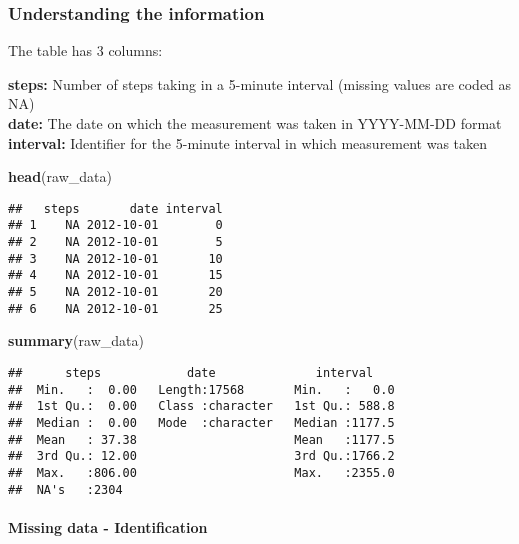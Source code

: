 \documentclass[
]{article}
\newenvironment{Shaded}{\begin{snugshade}}{\end{snugshade}}
\newcommand{\FunctionTok}[1]{\textcolor[rgb]{0.13,0.29,0.53}{\textbf{#1}}}
\newcommand{\NormalTok}[1]{#1}
\begin{document}
\hypertarget{understanding-the-information}{%
\subsubsection{Understanding the
information}\label{understanding-the-information}}

The table has 3 columns:

\textbf{steps:} Number of steps taking in a 5-minute interval (missing
values are coded as NA)\\
\textbf{date:} The date on which the measurement was taken in YYYY-MM-DD
format\\
\textbf{interval:} Identifier for the 5-minute interval in which
measurement was taken

\begin{Shaded}
\begin{Highlighting}[]
\FunctionTok{head}\NormalTok{(raw\_data)}
\end{Highlighting}
\end{Shaded}

\begin{verbatim}
##   steps       date interval
## 1    NA 2012-10-01        0
## 2    NA 2012-10-01        5
## 3    NA 2012-10-01       10
## 4    NA 2012-10-01       15
## 5    NA 2012-10-01       20
## 6    NA 2012-10-01       25
\end{verbatim}

\begin{Shaded}
\begin{Highlighting}[]
\FunctionTok{summary}\NormalTok{(raw\_data)}
\end{Highlighting}
\end{Shaded}

\begin{verbatim}
##      steps            date              interval     
##  Min.   :  0.00   Length:17568       Min.   :   0.0  
##  1st Qu.:  0.00   Class :character   1st Qu.: 588.8  
##  Median :  0.00   Mode  :character   Median :1177.5  
##  Mean   : 37.38                      Mean   :1177.5  
##  3rd Qu.: 12.00                      3rd Qu.:1766.2  
##  Max.   :806.00                      Max.   :2355.0  
##  NA's   :2304
\end{verbatim}

\hypertarget{missing-data---identification}{%
\paragraph{Missing data -
Identification}\label{missing-data---identification}}
\end{document}
